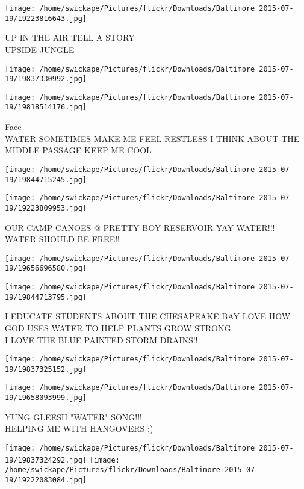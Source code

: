 \documentclass[10pt,letterpaper]{article}
\begin{document}
\vspace{0.25in}
\texttt{[image: /home/swickape/Pictures/flickr/Downloads/Baltimore 2015-07-19/19223816643.jpg]}

UP IN THE AIR TELL A STORY\\
UPSIDE JUNGLE
\pagebreak

\texttt{[image: /home/swickape/Pictures/flickr/Downloads/Baltimore 2015-07-19/19837330992.jpg]}

\vspace{0.25in}
\texttt{[image: /home/swickape/Pictures/flickr/Downloads/Baltimore 2015-07-19/19818514176.jpg]}

Face\\
WATER SOMETIMES MAKE ME FEEL RESTLESS I THINK ABOUT THE MIDDLE PASSAGE KEEP ME COOL
\pagebreak

\texttt{[image: /home/swickape/Pictures/flickr/Downloads/Baltimore 2015-07-19/19844715245.jpg]}

\vspace{0.25in}
\texttt{[image: /home/swickape/Pictures/flickr/Downloads/Baltimore 2015-07-19/19223809953.jpg]}

OUR CAMP CANOES @ PRETTY BOY RESERVOIR YAY WATER!!!\\
WATER SHOULD BE FREE!!
\pagebreak

\texttt{[image: /home/swickape/Pictures/flickr/Downloads/Baltimore 2015-07-19/19656696580.jpg]}

\vspace{0.25in}
\texttt{[image: /home/swickape/Pictures/flickr/Downloads/Baltimore 2015-07-19/19844713795.jpg]}

I EDUCATE STUDENTS ABOUT THE CHESAPEAKE BAY LOVE HOW GOD USES WATER TO HELP PLANTS GROW STRONG\\
I LOVE THE BLUE PAINTED STORM DRAINS!!
\pagebreak

\texttt{[image: /home/swickape/Pictures/flickr/Downloads/Baltimore 2015-07-19/19837325152.jpg]}

\vspace{0.25in}
\texttt{[image: /home/swickape/Pictures/flickr/Downloads/Baltimore 2015-07-19/19658093999.jpg]}

YUNG GLEESH "WATER" SONG!!!\\
HELPING ME WITH HANGOVERS :)
\pagebreak

\texttt{[image: /home/swickape/Pictures/flickr/Downloads/Baltimore 2015-07-19/19837324292.jpg]}
\texttt{[image: /home/swickape/Pictures/flickr/Downloads/Baltimore 2015-07-19/19222083084.jpg]}
\end{document}

